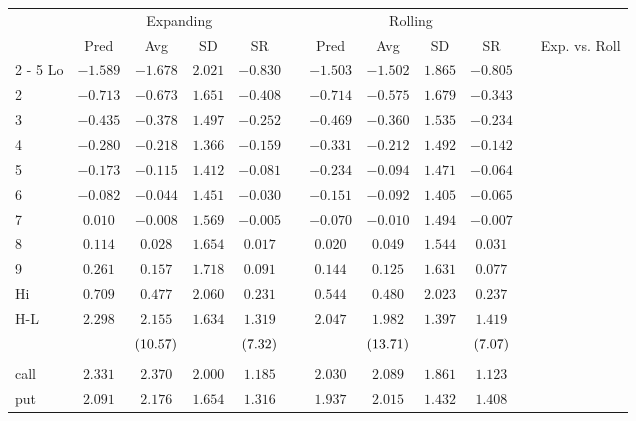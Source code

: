 \begin{tabular}{@{}lccccccccccc@{}}%
\toprule%
&\multicolumn{4}{c}{Expanding}&&\multicolumn{4}{c}{Rolling}&&\\%
\multicolumn{1}{c}{}&\multicolumn{1}{c}{Pred}&\multicolumn{1}{c}{Avg}&\multicolumn{1}{c}{SD}&\multicolumn{1}{c}{SR}&\multicolumn{1}{c}{}&\multicolumn{1}{c}{Pred}&\multicolumn{1}{c}{Avg}&\multicolumn{1}{c}{SD}&\multicolumn{1}{c}{SR}&\multicolumn{1}{c}{}&\multicolumn{1}{c}{Exp. vs. Roll}\\%
\cmidrule{2%
-%
5}%
\cmidrule{7%
-%
10}%
\cmidrule{12%
-%
12}%
Lo&$-1.589$&$-1.678$&$2.021$&$-0.830$&&$-1.503$&$-1.502$&$1.865$&$-0.805$&&\\%
2&$-0.713$&$-0.673$&$1.651$&$-0.408$&&$-0.714$&$-0.575$&$1.679$&$-0.343$&&\\%
3&$-0.435$&$-0.378$&$1.497$&$-0.252$&&$-0.469$&$-0.360$&$1.535$&$-0.234$&&\\%
4&$-0.280$&$-0.218$&$1.366$&$-0.159$&&$-0.331$&$-0.212$&$1.492$&$-0.142$&&\\%
5&$-0.173$&$-0.115$&$1.412$&$-0.081$&&$-0.234$&$-0.094$&$1.471$&$-0.064$&&\\%
6&$-0.082$&$-0.044$&$1.451$&$-0.030$&&$-0.151$&$-0.092$&$1.405$&$-0.065$&&\\%
7&$0.010$&$-0.008$&$1.569$&$-0.005$&&$-0.070$&$-0.010$&$1.494$&$-0.007$&&\\%
8&$0.114$&$0.028$&$1.654$&$0.017$&&$0.020$&$0.049$&$1.544$&$0.031$&&\\%
9&$0.261$&$0.157$&$1.718$&$0.091$&&$0.144$&$0.125$&$1.631$&$0.077$&&\\%
Hi&$0.709$&$0.477$&$2.060$&$0.231$&&$0.544$&$0.480$&$2.023$&$0.237$&&\\%
\midrule%
H{-}L&$2.298$&$2.155$&$1.634$&$1.319$&&$2.047$&$1.982$&$1.397$&$1.419$&&\\%
&&$\footnotesize{(10.57)}$&&$\footnotesize{(7.32)}$&&&$\footnotesize{(13.71)}$&&$\footnotesize{(7.07)}$&&\\%
&&&&&&&&&&&\\%
call&$2.331$&$2.370$&$2.000$&$1.185$&&$2.030$&$2.089$&$1.861$&$1.123$&&\\%
put&$2.091$&$2.176$&$1.654$&$1.316$&&$1.937$&$2.015$&$1.432$&$1.408$&&\\\bottomrule%
%
\end{tabular}